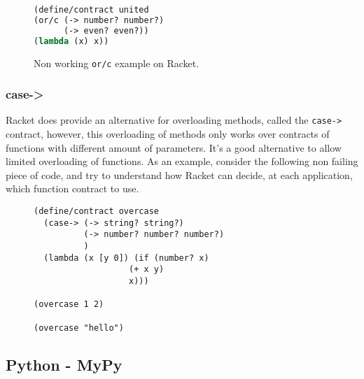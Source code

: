\documentclass[sigplan,10pt,review,anonymous]{acmart}
\newcommand{\unsure}[2][1=]{}
\newcommand{\racket}[1]{\lstinline[language=racket]{#1}}
\begin{document}
\begin{figure}[h]

\begin{lstlisting}[language=lisp]
(define/contract united
(or/c (-> number? number?)
      (-> even? even?))
(lambda (x) x))
\end{lstlisting}
\caption{Non working \racket{or/c} example on Racket.}
\label{code:racket:or/c:non-working}

\end{figure}


\unsure{This section is overall a bit hard to follow. I
  think I've figured out what it means, but it needs more love. Also
  give an example which doesn't work and one that does for or/c.}

\subsubsection*{case->}

Racket does provide an alternative for overloading methods, called the
\racket{case->} contract, however, this overloading of methods only
works over contracts of functions with different amount of parameters.
It's a good alternative to allow limited overloading of functions.
As an example, consider the following non failing piece of code, and
try to understand how Racket can decide, at each application,
which function contract to use.

\begin{figure}[h]

\begin{lstlisting}[language=racket]
(define/contract overcase
  (case-> (-> string? string?)
          (-> number? number? number?)
          )
  (lambda (x [y 0]) (if (number? x)
                   (+ x y)
                   x)))

(overcase 1 2)

(overcase "hello")
\end{lstlisting}
\end{figure}


\subsection{Python - MyPy}

\unsure{We ought to group all the static typing in one subsection}
\end{document}
